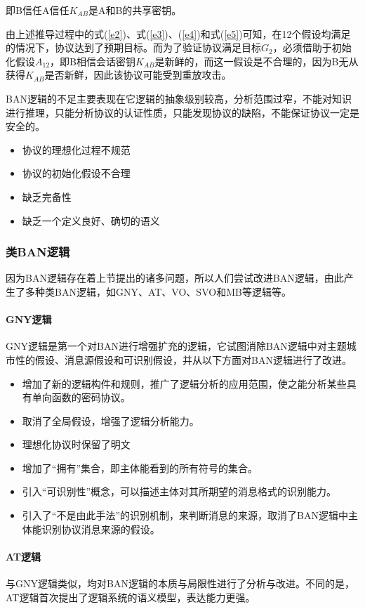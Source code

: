 \documentclass[cs4size,a4pape,UTF8]{ctexart}
\numberwithin{equation}{section}
\numberwithin{table}{section}
\numberwithin{figure}{section}
\begin{document}
即B信任A信任$K_{AB}$是A和B的共享密钥。

由上述推导过程中的式(\ref{e2})、式(\ref{e3})、(\ref{e4})和式(\ref{e5})可知，在12个假设均满足的情况下，协议达到了预期目标。而为了验证协议满足目标$G_{2}$，必须借助于初始化假设$A_{12}$，即B相信会话密钥$K_{AB}$是新鲜的，而这一假设是不合理的，因为B无从获得$K_{AB}$是否新鲜，因此该协议可能受到重放攻击。

BAN逻辑的不足主要表现在它逻辑的抽象级别较高，分析范围过窄，不能对知识进行推理，只能分析协议的认证性质，只能发现协议的缺陷，不能保证协议一定是安全的\cite{4}。

\begin{itemize}
\item 协议的理想化过程不规范
\item 协议的初始化假设不合理
\item 缺乏完备性
\item 缺乏一个定义良好、确切的语义
\end{itemize}

\subsubsection{类BAN逻辑}
因为BAN逻辑存在着上节提出的诸多问题，所以人们尝试改进BAN逻辑，由此产生了多种类BAN逻辑，如GNY、AT、VO、SVO和MB等逻辑等。
\paragraph{GNY逻辑}
GNY逻辑是第一个对BAN进行增强扩充的逻辑，它试图消除BAN逻辑中对主题城市性的假设、消息源假设和可识别假设，并从以下方面对BAN逻辑进行了改进。

\begin{itemize}
\item 增加了新的逻辑构件和规则，推广了逻辑分析的应用范围，使之能分析某些具有单向函数的密码协议。
\item 取消了全局假设，增强了逻辑分析能力。
\item 理想化协议时保留了明文
\item 增加了“拥有”集合，即主体能看到的所有符号的集合。
\item 引入“可识别性”概念，可以描述主体对其所期望的消息格式的识别能力。
\item 引入了“不是由此手法”的识别机制，来判断消息的来源，取消了BAN逻辑中主体能识别协议消息来源的假设。
\end{itemize}

\paragraph{AT逻辑}
与GNY逻辑类似，均对BAN逻辑的本质与局限性进行了分析与改进。不同的是，AT逻辑首次提出了逻辑系统的语义模型，表达能力更强。
\end{document}
